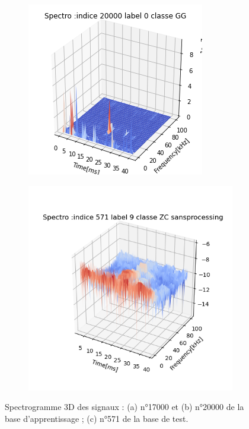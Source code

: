 \begin{figure}[!h]
\begin{subfigure}[l]{0.5\textwidth}
    \includegraphics[width=\textwidth]{./images/indice20000Spectro3Dlabel9classeZCsansprocessingsanszoom.png}
        \caption{}
  \end{subfigure}
  \newline
  \begin{subfigure}[l]{0.5\textwidth}
    \includegraphics[width=\textwidth]{./images/indice571Spectro3Dlabel9classeZCsansprocessingsanszoom.png}
        \caption{}
  \end{subfigure}
  \newline
  \caption{Spectrogramme 3D des signaux : (a) n°17000 et (b) n°20000 de la base d'apprentissage ; (c) n°571 de la base de test.%
	\label{fig:spectros3D}}
\end{figure}

